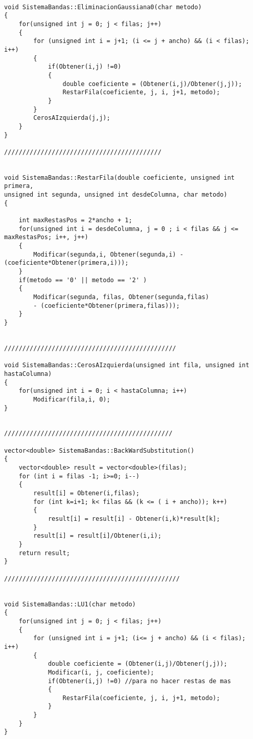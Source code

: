 \begin{verbatim}

void SistemaBandas::EliminacionGaussiana0(char metodo)
{
    for(unsigned int j = 0; j < filas; j++) 
    {
	    for (unsigned int i = j+1; (i <= j + ancho) && (i < filas); i++) 
        {
            if(Obtener(i,j) !=0)
            {	
                double coeficiente = (Obtener(i,j)/Obtener(j,j));
                RestarFila(coeficiente, j, i, j+1, metodo);
            }
        }
        CerosAIzquierda(j,j);
    }
}

///////////////////////////////////////////


void SistemaBandas::RestarFila(double coeficiente, unsigned int primera,
unsigned int segunda, unsigned int desdeColumna, char metodo)
{

    int maxRestasPos = 2*ancho + 1; 
    for(unsigned int i = desdeColumna, j = 0 ; i < filas && j <= maxRestasPos; i++, j++) 
	{
        Modificar(segunda,i, Obtener(segunda,i) - (coeficiente*Obtener(primera,i)));
	}
    if(metodo == '0' || metodo == '2' ) 
    {
        Modificar(segunda, filas, Obtener(segunda,filas)
        - (coeficiente*Obtener(primera,filas)));
    } 
}


///////////////////////////////////////////////

void SistemaBandas::CerosAIzquierda(unsigned int fila, unsigned int hastaColumna)
{
    for(unsigned int i = 0; i < hastaColumna; i++) 
        Modificar(fila,i, 0);
}


//////////////////////////////////////////////

vector<double> SistemaBandas::BackWardSubstitution()
{
	vector<double> result = vector<double>(filas);
    for (int i = filas -1; i>=0; i--)
    {
        result[i] = Obtener(i,filas);
        for (int k=i+1; k< filas && (k <= ( i + ancho)); k++)
        {
            result[i] = result[i] - Obtener(i,k)*result[k];
        }
        result[i] = result[i]/Obtener(i,i);
    }
    return result;
}

////////////////////////////////////////////////


void SistemaBandas::LU1(char metodo)
{
    for(unsigned int j = 0; j < filas; j++) 
    {
        for (unsigned int i = j+1; (i<= j + ancho) && (i < filas); i++)
        {
            double coeficiente = (Obtener(i,j)/Obtener(j,j));
            Modificar(i, j, coeficiente);
            if(Obtener(i,j) !=0) //para no hacer restas de mas
            {	
                RestarFila(coeficiente, j, i, j+1, metodo);
            }
        }
    }
}



\end{verbatim}
